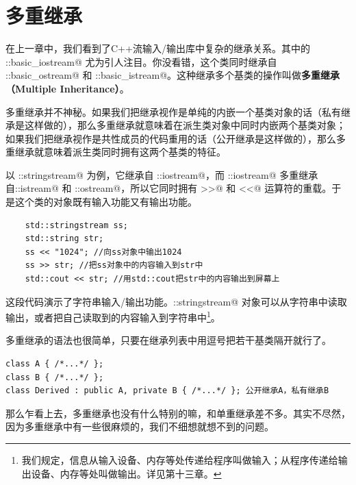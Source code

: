 \section{多重继承}
在上一章中，我们看到了C++流输入/输出库中复杂的继承关系。其中的 \lstinline@std::basic_iostream@ 尤为引人注目。你没看错，这个类同时继承自 \lstinline@std::basic_ostream@ 和 \lstinline@std::basic_istream@。这种继承多个基类的操作叫做\textbf{多重继承（Multiple Inheritance）}。\par
多重继承并不神秘。如果我们把继承视作是单纯的内嵌一个基类对象的话（私有继承是这样做的），那么多重继承就意味着在派生类对象中同时内嵌两个基类对象；如果我们把继承视作是共性成员的代码重用的话（公开继承是这样做的），那么多重继承就意味着派生类同时拥有这两个基类的特征。\par
以 \lstinline@std::stringstream@ 为例，它继承自 \lstinline@std::iostream@，而 \lstinline@std::iostream@ 多重继承自\linebreak\lstinline@std::istream@ 和 \lstinline@std::ostream@，所以它同时拥有 \lstinline@>>@ 和 \lstinline@<<@ 运算符的重载。于是这个类的对象既有输入功能又有输出功能。\par
\begin{lstlisting}
    std::stringstream ss;
    std::string str;
    ss << "1024"; //向ss对象中输出1024
    ss >> str; //把ss对象中的内容输入到str中
    std::cout << str; //用std::cout把str中的内容输出到屏幕上
\end{lstlisting}
这段代码演示了字符串输入/输出功能。\lstinline@std::stringstream@ 对象可以从字符串中读取输出，或者把自己读取到的内容输入到字符串中\footnote{我们规定，信息从输入设备、内存等处传递给程序叫做输入；从程序传递给输出设备、内存等处叫做输出。详见第十三章。}。\par
多重继承的语法也很简单，只要在继承列表中用逗号把若干基类隔开就行了。
\begin{lstlisting}
class A { /*...*/ };
class B { /*...*/ };
class Derived : public A, private B { /*...*/ }; 公开继承A，私有继承B
\end{lstlisting}\par
那么乍看上去，多重继承也没有什么特别的嘛，和单重继承差不多。其实不尽然，因为多重继承中有一些很麻烦的，我们不细想就想不到的问题。
